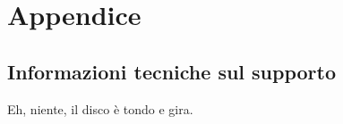 \section{Appendice}
\subsection{Informazioni tecniche sul supporto}

Eh, niente, il disco \`e tondo e gira.

\clearpage

